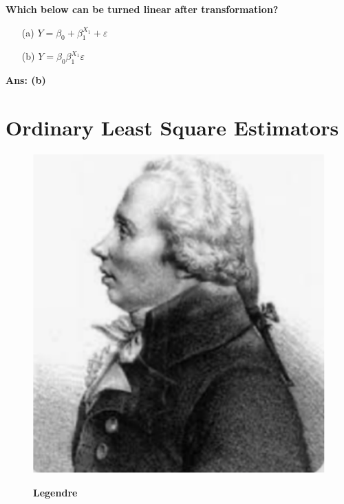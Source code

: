 \documentclass[14pt]{extarticle}
\begin{document}
\bigskip

\noindent
\textbf{Which below can be turned linear after transformation?}

\begin{itemize}
  \item[(a)] $Y = \beta_0 + \beta_1^{X_1} + \varepsilon$
  \item[(b)] $Y = \beta_0 \beta_1^{X_1} \varepsilon$
\end{itemize}

\textbf{Ans: (b)}

\section*{Ordinary Least Square Estimators}
\begin{figure}[H]
    \centering
    \begin{minipage}{0.5\textwidth}
        \includegraphics[width=\textwidth]{fig9.png}
    \end{minipage}%
    \hfill
    \begin{minipage}{0.5\textwidth}
        \vspace*{0.01\textheight} %
        \centering
        \textbf{Legendre}
    \end{minipage}
\end{figure}
\end{document}

